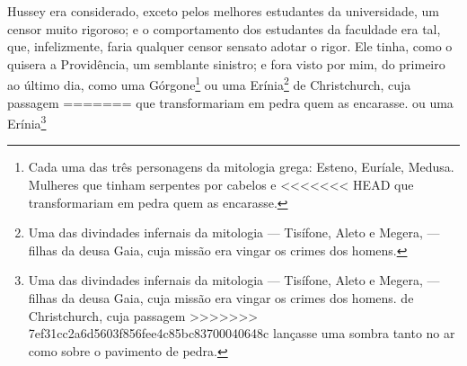 {{{{{{{{{{{{{{{{{{{{{{{{{{{{{{{{{{{{{{{{{{{{{{{{{{{{{{{{{{{{{{{{{{{{{{{{{{{{{{{{{{{{{{{{{{{{{{{{{Hussey era considerado, exceto pelos melhores estudantes da
universidade, um censor muito rigoroso; e o comportamento dos estudantes
da faculdade era tal, que, infelizmente, faria qualquer censor sensato
adotar o rigor. Ele tinha, como o quisera a Providência, um semblante
sinistro; e fora visto por mim, do primeiro ao último dia, como uma
Górgone\footnote{Cada uma das três personagens da mitologia grega:
  Esteno, Euríale, Medusa. Mulheres que tinham serpentes por cabelos e
<<<<<<< HEAD
  que transformariam em pedra quem as encarasse.} ou uma
Erínia\footnote{Uma das divindades infernais da mitologia --- Tisífone,
  Aleto e Megera, --- filhas da deusa Gaia, cuja missão era vingar os
  crimes dos homens.} de Christchurch, cuja passagem
=======
  que transformariam em pedra quem as encarasse.  ou uma
Erínia\footnote{Uma das divindades infernais da mitologia --- Tisífone,
  Aleto e Megera, --- filhas da deusa Gaia, cuja missão era vingar os
  crimes dos homens.  de Christchurch, cuja passagem
>>>>>>> 7ef31cc2a6d5603f856fee4c85bc83700040648c
lançasse uma sombra tanto no ar como sobre o pavimento de pedra.

}}}}}}}}}}}}}}}}}}}}}}}}}}}}}}}}}}}}}}}}}}}}}}}}}}}}}}}}}}}}}}}}}}}}}}}}}}}}}}}}}}}}}}}}}}}}}}}}}}
